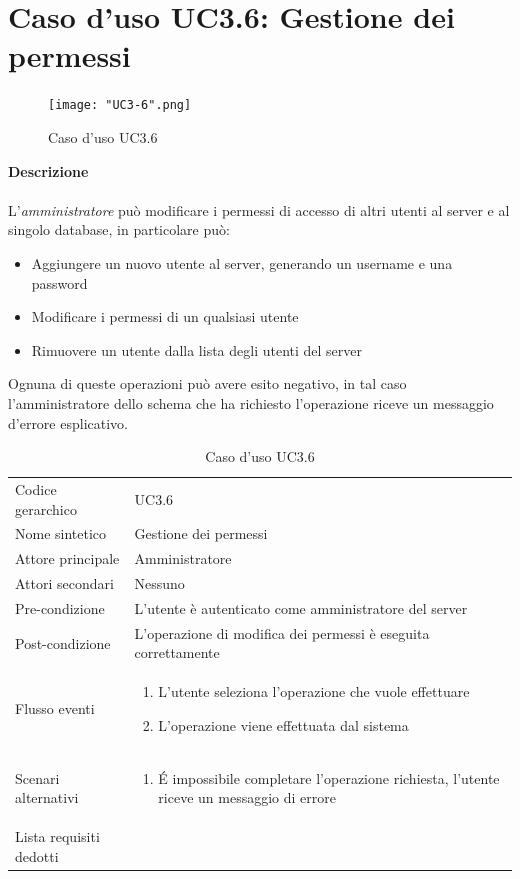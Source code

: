 \documentclass[a4paper]{report}
\begin{document}
	 \section{Caso d'uso UC3.6: Gestione dei permessi}
	 	\begin{figure}[H]
			\centering
			\texttt{[image: "UC3-6".png]}
			\caption{Caso d'uso UC3.6}
		\end{figure}
	 \textbf{Descrizione} \\ \\
	 L'\emph{amministratore} può modificare i permessi di accesso di altri utenti al server e al singolo
	  database, in particolare può:
	 \begin{itemize}
	 	\item Aggiungere un nuovo utente al server, generando un username e una password
	 	\item Modificare i permessi di un qualsiasi utente
	 	\item Rimuovere un utente dalla lista degli utenti del server
	 \end{itemize}
	 Ognuna di queste operazioni può avere esito negativo, in tal caso l'amministratore dello schema che ha
	 richiesto l'operazione riceve un messaggio d'errore esplicativo.
		\begin{table}[H]
		\begin{tabularx}{\textwidth}{X | X}\toprule
			\rowcolor{orange!65}Codice gerarchico & UC3.6 \\
			Nome sintetico & Gestione dei permessi \\
			\rowcolor{orange!65}Attore principale & Amministratore\\
			Attori secondari & Nessuno \\
			\rowcolor{orange!65}Pre-condizione & L'utente è autenticato come amministratore del server\\
			Post-condizione & L'operazione di modifica dei permessi è eseguita correttamente \\
			\rowcolor{orange!65}Flusso eventi & \begin{enumerate}
			\item L'utente seleziona l'operazione che vuole effettuare
			\item L'operazione viene effettuata dal sistema
			\end{enumerate} \\
			Scenari alternativi & \begin{enumerate}
			\item \'E impossibile completare l'operazione richiesta, l'utente riceve un messaggio di errore
			\end{enumerate} \\
			\rowcolor{orange!65}Lista requisiti dedotti & \\
			\bottomrule
		\end{tabularx}
		\caption{Caso d'uso UC3.6}
	 \end{table}
\end{document}
